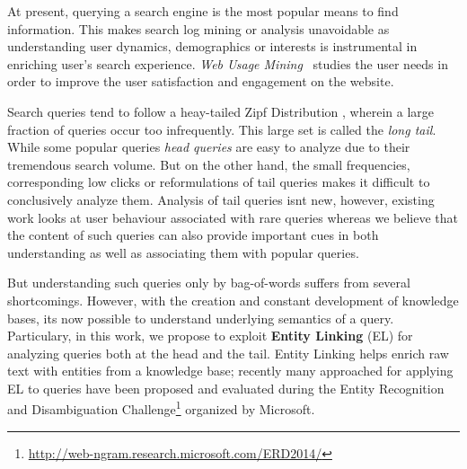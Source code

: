 At present, querying a search engine is the most popular means to find information. This makes
search log mining or analysis unavoidable as understanding user dynamics, demographics or interests
is instrumental in enriching user's search experience. \emph{Web Usage Mining}~\cite{silvestri2010mining}  
studies the user needs in order to improve the user satisfaction and engagement on the website. 

Search queries tend to follow a heay-tailed Zipf Distribution \cite{baeza2007impact}, wherein a large 
fraction of queries occur too infrequently. This large set is called the \emph{long tail}. While some 
popular queries \emph{head queries} are easy to analyze due to their tremendous search volume. 
But on the other hand, the small frequencies, corresponding low clicks or reformulations 
of tail queries makes it difficult to conclusively analyze them. Analysis of tail queries isnt new, 
however, existing work \cite{Doug2007Sigir,Goel2010Wsdm} looks at user behaviour associated with
rare queries whereas we believe that the content of such queries can also provide important cues in both
understanding as well as associating them with popular queries. 

But understanding such queries only by bag-of-words suffers from several shortcomings. However, with the 
creation and constant development of knowledge bases, its now possible to understand underlying semantics
of a query. Particulary, in this work, we propose to exploit \textbf{Entity Linking} (EL) for analyzing queries 
both at the head and the tail. Entity Linking helps enrich raw text with entities from a knowledge base; recently 
many approached for applying EL to queries have been proposed and evaluated during the Entity Recognition and Disambiguation Challenge\footnote{\url{http://web-ngram.research.microsoft.com/ERD2014/}} organized by Microsoft. 



